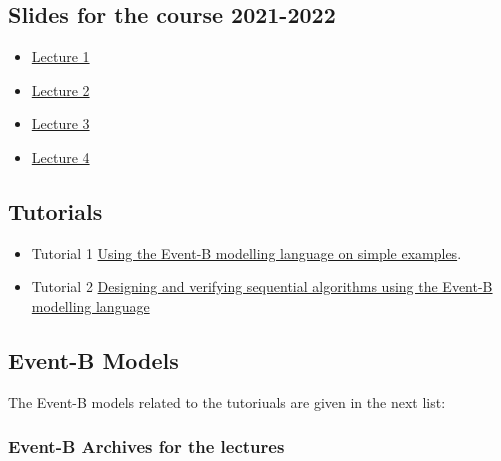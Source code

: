 \documentclass[ 12pt]{article}
\begin{document}
\subsection{Slides for the course 2021-2022}

\begin{itemize}
\item[]  
  \href{http://mery54.github.io/teaching/mosos/lecturesnotes/2021-22-MLS-00.pdf}{Lecture
    1 }
\item[]  
  \href{http://mery54.github.io/teaching/mosos/lecturesnotes/2021-22-MLS-01.pdf}{Lecture
    2 }
  \item[]  
  \href{http://mery54.github.io/teaching/mosos/lecturesnotes/2021-22-MLS-02.pdf}{Lecture
    3 }
  \item[]  
  \href{http://mery54.github.io/teaching/mosos/lecturesnotes/2021-22-MLS-03.pdf}{Lecture 4 }
\end{itemize}



\subsection{Tutorials}

\begin{itemize}
 
  \item[]   Tutorial 1 
    \href{http://mery54.github.io/teaching/mosos/lecturesnotes/mastertutorial1.pdf}{Using 
      the Event-B modelling language on simple examples}.


    
  \item[]   Tutorial 2
    \href{http://mery54.github.io/teaching/mosos/lecturesnotes/mastertutorial2.pdf}{Designing
      and verifying sequential algorithms using the Event-B modelling      language}
  
  \end{itemize}

    \subsection{Event-B Models}
\label{sec:event-b-models}


The Event-B models related to the tutoriuals are given in the next list: 

\subsubsection{Event-B Archives for the  lectures}
\end{document}
